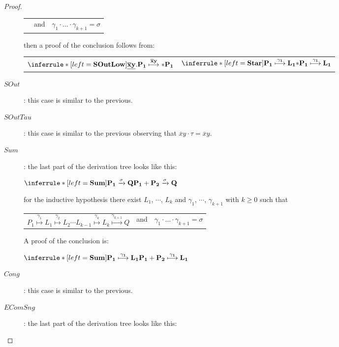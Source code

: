 \begin{proposition}
\begin{proof}
\begin{description}
\begin{center}
\begin{tabular}{lll}
	      &
		and
	      &
		$\gamma_{1} \cdot \ldots \cdot \gamma_{k+1} =  \sigma$
	      \end{tabular}
	    \end{center}
	    then a proof of the conclusion follows from:
	    \begin{center}
	      \begin{tabular}{ll}
		$\inferrule* [left=\bf{SOutLow}]{
 		}{
 		  \underline{\overline{x}y}.P_{1} \stackrel{\overline{x}y}{\longmapsto} *P_{1}
 		}$
	      &
		$\inferrule* [left=\bf{Star}]{
 		  P_{1} \stackrel{\gamma_{1}}{\longmapsto} L_{1}
 		}{
 		  *P_{1} \stackrel{\gamma_{1}}{\longmapsto} L_{1}
 		}$
	      \end{tabular}
	    \end{center}
	  \item[$SOut$]: this case is similar to the previous.
	  \item[$SOutTau$]: this case is similar to the previous observing that $\overline{x}y \cdot \tau = \overline{x}y$.
	  \item[$Sum$]: 
	the last part of the derivation tree looks like this:
	\begin{center}
	  $\inferrule* [left=\bf{Sum}]{
	    P_{1} \xrightarrow{\sigma} Q
	  }{
	    P_{1}+P_{2} \xrightarrow{\sigma} Q
	  }$
	\end{center}
	for the inductive hypothesis there exist $L_{1}$, $\cdots$, $L_{k}$ and $\gamma_{1}$, $\cdots$, $\gamma_{k+1}$ with $k\geq 0$ such that 
	\begin{center}
	  \begin{tabular}{lll}
	    $P_{1} \stackrel{\gamma_{1}}{\longmapsto} L_{1}  \stackrel{\gamma_{2}}{\longmapsto} L_{2} \cdots L_{k-1} \stackrel{\gamma_{k}}{\longmapsto} L_{k} \stackrel{\gamma_{k+1}}{\longmapsto} Q$ 
	  &
	    and
	  &
	    $\gamma_{1} \cdot \ldots \cdot \gamma_{k+1} =  \sigma$  
	  \end{tabular}
	\end{center}
	A proof of the conclusion is:
	\begin{center}
	  $\inferrule* [left=\bf{Sum}]{
	      P_{1} \stackrel{\gamma_{1}}{\longmapsto} L_{1}
	    }{
	      P_{1}+P_{2} \stackrel{\gamma_{1}}{\longmapsto} L_{1}
	    }
	  $
	\end{center}
      \item[$Cong$]: this case is similar to the previous.
      \item[$EComSng$]: 
	the last part of the derivation tree looks like this:
	\begin{center}

\end{center}
\end{description}
\end{proof}
\end{proposition}
